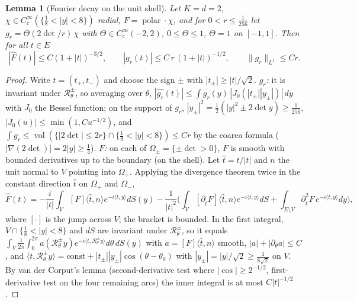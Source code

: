 \documentclass[10pt]{article}
\newtheorem{lemma}[theorem]{Lemma}
\theoremstyle{definition}
\theoremstyle{remark}
\newcommand{\inner}[2]{\langle #1, #2\rangle}
\newcommand{\polar}{\operatorname{polar}}
\newcommand{\vol}{\operatorname{vol}}
\begin{document}
\begin{lemma}[Fourier decay on the unit shell]\label{lem:decay}
Let $K=d=2$, $\chi\in C_c^\infty(\{\frac18<|y|<8\})$ radial, $F=\polar\cdot\chi$, and for $0<r\le\frac1{256}$ let
$g_r=\Theta(2\det/r)\,\chi$ with $\Theta\in C_c^\infty(-2,2)$, $0\le\Theta\le1$, $\Theta=1$ on $[-1,1]$. Then for all $t\in E$
\[
|\widehat F(t)|\le C(1+|t|)^{-3/2},\qquad|\widehat{g_r}(t)|\le C\,r\,(1+|t|)^{-1/2},\qquad\|g_r\|_{L^1}\le Cr .
\]
\end{lemma}
\begin{proof}
Write $t=(t_+,t_-)$ and choose the sign $\pm$ with $|t_\pm|\ge|t|/\sqrt2$. \emph{$g_r$:} it is invariant under
$\mathcal R^\pm_\theta$, so averaging over $\theta$,
$|\widehat{g_r}(t)|\le\int g_r(y)\,|J_0(|t_\pm||y_\pm|)|\,dy$ with $J_0$ the Bessel function; on the support of $g_r$,
$|y_\pm|^2=\frac12(|y|^2\pm2\det y)\ge\frac1{256}$, $|J_0(u)|\le\min(1,Cu^{-1/2})$, and $\int g_r\le\vol(\{|2\det|\le2r\}\cap\{\frac18<|y|<8\})\le Cr$
by the coarea formula ($|\nabla(2\det)|=2|y|\ge\frac14$). \emph{$F$:} on each of $\Omega_\pm=\{\pm\det>0\}$, $F$ is smooth with
bounded derivatives up to the boundary (on the shell). Let $\hat t=t/|t|$ and $n$ the unit normal to $V$ pointing into
$\Omega_+$. Applying the divergence theorem twice in the constant direction $\hat t$ on $\Omega_+$ and $\Omega_-$,
\[
\widehat F(t)=-\frac i{|t|}\int_V[F]\inner{\hat t}{n}e^{-i\inner ty}dS(y)-\frac1{|t|^2}\Big(\int_V[\partial_{\hat t}F]\inner{\hat t}ne^{-i\inner ty}dS
+\int_{E\setminus V}\partial^2_{\hat t}F\,e^{-i\inner ty}dy\Big),
\]
where $[\cdot]$ is the jump across $V$; the bracket is bounded. In the first integral, $V\cap\{\frac18<|y|<8\}$ and $dS$
are invariant under $\mathcal R^\pm_\theta$, so it equals
$\int_V\frac1{2\pi}\int_0^{2\pi}a(\mathcal R^\pm_\theta y)e^{-i\inner t{\mathcal R^\pm_\theta y}}d\theta\,dS(y)$ with
$a=[F]\inner{\hat t}n$ smooth, $|a|+|\partial_\theta a|\le C$, and
$\inner t{\mathcal R^\pm_\theta y}=\mathrm{const}+|t_\pm||y_\pm|\cos(\theta-\theta_0)$ with $|y_\pm|=|y|/\sqrt2\ge\frac1{8\sqrt2}$ on $V$.
By van der Corput's lemma \cite[Ch.~VIII, \S1.2]{stein} (second-derivative test where $|\cos|\ge2^{-1/2}$, first-derivative
test on the four remaining arcs) the inner integral is at most $C|t|^{-1/2}$.
\end{proof}
\end{document}
